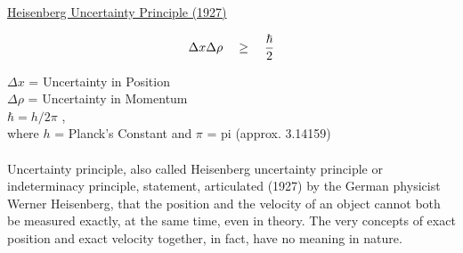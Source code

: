 \begin{Large}

\begin{center}
\underline{Heisenberg Uncertainty Principle (1927)}
\end{center}
\begin{equation}
\Delta x\Delta\rho\quad\ge\quad{\hbar \over 2}
\end{equation}

\end{Large}

$\Delta x$ = Uncertainty in Position\\
$\Delta\rho$ = Uncertainty in Momentum\\
$\hbar={{h}/{2\pi}}$ ,\\
where $h$ = Planck's Constant and $\pi$ = pi (approx. 3.14159)
\\\\
Uncertainty principle, also called Heisenberg uncertainty principle or indeterminacy principle, statement, articulated (1927) by the German physicist Werner Heisenberg, that the position and the velocity of an object cannot both be measured exactly, at the same time, even in theory. The very concepts of exact position and exact velocity together, in fact, have no meaning in nature.







